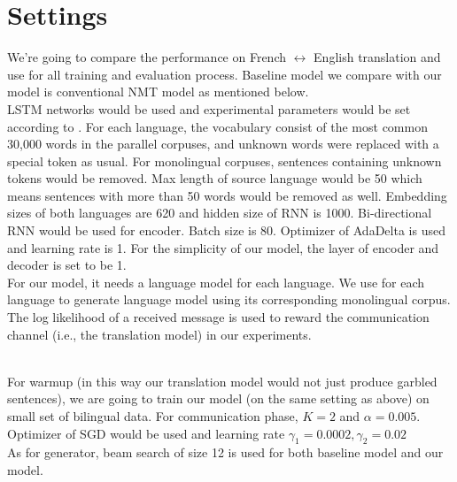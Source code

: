 \documentclass[11pt]{article}
\begin{document}
{\part{Settings}
We're going to compare the performance on French $\leftrightarrow$ English translation and use \href{https://github.com/OpenNMT/OpenNMT-py}{\color{blue}{OpenNMT in PyTorch }} for all training and evaluation process. Baseline model we compare with our model is conventional NMT model as mentioned below.
\\
\newline
\indent LSTM networks would be used and experimental parameters would be set according to \cite{bahdanau2014neural}. For each language, the vocabulary consist of the most common 30,000 words in the parallel corpuses, and unknown words were replaced with a special token as usual. For monolingual corpuses, sentences containing unknown tokens would be removed. Max length of source language would be 50 which means sentences with more than 50 words would be removed as well. Embedding sizes of both languages are 620 and hidden size of RNN is 1000. Bi-directional RNN would be used for encoder. Batch size is 80. Optimizer of AdaDelta is used and learning rate is 1. For the simplicity of our model, the layer of encoder and decoder is set to be 1.
\\
\newline
\indent For our model, it needs a language model for each language. We use \href{https://github.com/mspandit/rnnlm}{\color{blue}{RNNLM Toolkit}}\cite{mikolov2010recurrent} for each language to generate language model using its corresponding monolingual corpus. The log likelihood of a received message is used to reward the communication channel (i.e., the translation model) in our experiments.

{\color{red}{Setting here...}}
\\
\newline
\indent For warmup (in this way our translation model would not just produce garbled sentences), we are going to train our model (on the same setting as above) on small set of bilingual data. For communication phase, $K=2$ and $\alpha = 0.005$. Optimizer of SGD would be used and learning rate $\gamma_1 = 0.0002, \gamma_2=0.02$
\\
\newline
\indent As for generator, beam search of size 12 is used for both baseline model and our model.
}
\end{document}
